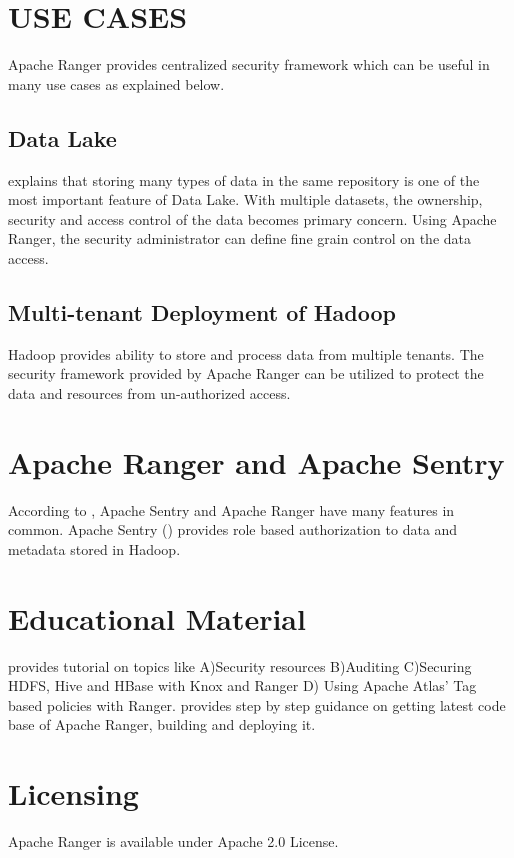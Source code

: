 \documentclass[9pt,twocolumn,twoside]{../../styles/osajnl}
\begin{document}
\section{USE CASES}
Apache Ranger provides centralized security framework which can be useful in
many use cases as explained below.

\subsection{Data Lake}
\cite{data-lake-whitepaper} explains that storing many types of data in the
same repository is one of the most important feature of Data Lake\SE. With
multiple datasets, the ownership, security and access control of the data
becomes primary concern. Using Apache Ranger, the security administrator can
define fine grain control on the data access.



\subsection{Multi-tenant Deployment of Hadoop}
Hadoop provides ability to store and process data from multiple
tenants. The security framework provided by Apache Ranger can be utilized to
protect the data and resources from un-authorized access.

\section{Apache Ranger and Apache Sentry}
According to \cite{www-5security-blog}, Apache Sentry and Apache Ranger have
many features in common. Apache Sentry (\cite{www-apache-sentry}) provides
role based authorization to data and metadata stored in Hadoop.

\section{Educational Material}
\cite{www-ranger-tutorial} provides tutorial on topics like A)Security
resources B)Auditing C)Securing HDFS, Hive and HBase with Knox and Ranger D)
Using Apache Atlas' Tag based policies with Ranger.
\cite{www-ranger-quickstart} provides step by step guidance on getting latest
code base of Apache Ranger, building and deploying it.

\section{Licensing}
Apache Ranger is available under Apache 2.0 License.
\end{document}
